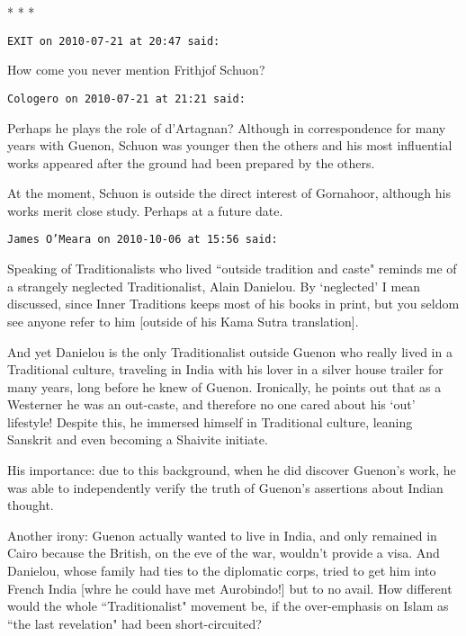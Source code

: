 
\begin{center}* * *\end{center}

\begin{footnotesize}\begin{sffamily}



\texttt{EXIT on 2010-07-21 at 20:47 said: }

How come you never mention Frithjof Schuon?


\hfill

\texttt{Cologero on 2010-07-21 at 21:21 said: }

Perhaps he plays the role of d'Artagnan? Although in correspondence for many years with Guenon, Schuon was younger then the others and his most influential works appeared after the ground had been prepared by the others.

At the moment, Schuon is outside the direct interest of Gornahoor, although his works merit close study. Perhaps at a future date.


\hfill

\texttt{James O'Meara on 2010-10-06 at 15:56 said: }

Speaking of Traditionalists who lived ``outside tradition and caste" reminds me of a strangely neglected Traditionalist, Alain Danielou. By `neglected' I mean discussed, since Inner Traditions keeps most of his books in print, but you seldom see anyone refer to him [outside of his Kama Sutra translation]. 

And yet Danielou is the only Traditionalist outside Guenon who really lived in a Traditional culture, traveling in India with his lover in a silver house trailer for many years, long before he knew of Guenon. Ironically, he points out that as a Westerner he was an out-caste, and therefore no one cared about his `out' lifestyle! Despite this, he immersed himself in Traditional culture, leaning Sanskrit and even becoming a Shaivite initiate. 

His importance: due to this background, when he did discover Guenon's work, he was able to independently verify the truth of Guenon's assertions about Indian thought. 

Another irony: Guenon actually wanted to live in India, and only remained in Cairo because the British, on the eve of the war, wouldn't provide a visa. And Danielou, whose family had ties to the diplomatic corps, tried to get him into French India [whre he could have met Aurobindo!] but to no avail. How different would the whole ``Traditionalist" movement be, if the over-emphasis on Islam as ``the last revelation" had been short-circuited?



\end{sffamily}
\end{footnotesize}
